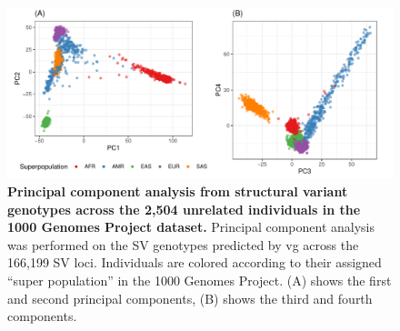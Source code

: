 \documentclass[11pt]{ucscthesis}
\begin{document}
\begin{figure}[H]
  \includegraphics[width=\linewidth]{fig-sv-1kgp-pcs.pdf}
  \caption[PCA of SV genotypes in the 1000 Genomes Project]{{\bf Principal component analysis from structural variant genotypes across the 2,504 unrelated individuals in the 1000 Genomes Project dataset. }
    Principal component analysis was performed on the SV genotypes predicted by vg across the 166,199 SV loci.
    Individuals are colored according to their assigned ``super population'' in the 1000 Genomes Project.
    (A) shows the first and second principal components, (B) shows the third and fourth components.
  }
  \label{fig:1kgp-sv-pcs}
\end{figure}
\newpage
\end{document}
